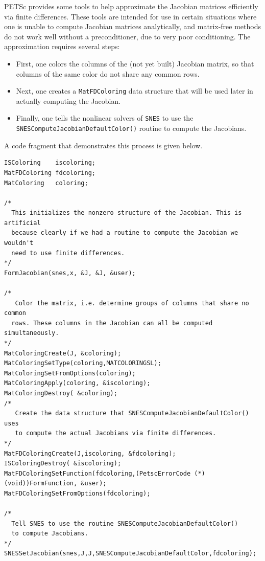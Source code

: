 PETSc provides some tools to help approximate the Jacobian matrices efficiently via
finite differences.  These tools are intended for use in certain situations where
one is unable to compute Jacobian matrices analytically, and matrix-free methods
do not work well without a preconditioner, due to very poor conditioning.
The approximation requires several steps:
\begin{itemize}
\item First, one colors the columns of the (not yet built) Jacobian matrix, so that
      columns of the same color do not share any common rows.
\item Next, one creates a \lstinline{MatFDColoring} data structure that will be used later in
      actually computing the Jacobian.
\item Finally, one tells the nonlinear solvers of \lstinline{SNES} to use the
      \lstinline{SNESComputeJacobianDefaultColor()}
      routine to compute the Jacobians.
\end{itemize}
A code fragment that demonstrates this process is given below.
\begin{lstlisting}
ISColoring    iscoloring;
MatFDColoring fdcoloring;
MatColoring   coloring;

/*
  This initializes the nonzero structure of the Jacobian. This is artificial
  because clearly if we had a routine to compute the Jacobian we wouldn't
  need to use finite differences.
*/
FormJacobian(snes,x, &J, &J, &user);

/*
   Color the matrix, i.e. determine groups of columns that share no common 
  rows. These columns in the Jacobian can all be computed simultaneously.
*/
MatColoringCreate(J, &coloring);
MatColoringSetType(coloring,MATCOLORINGSL);
MatColoringSetFromOptions(coloring);
MatColoringApply(coloring, &iscoloring);
MatColoringDestroy( &coloring);
/*
   Create the data structure that SNESComputeJacobianDefaultColor() uses
   to compute the actual Jacobians via finite differences.
*/
MatFDColoringCreate(J,iscoloring, &fdcoloring);
ISColoringDestroy( &iscoloring);
MatFDColoringSetFunction(fdcoloring,(PetscErrorCode (*)(void))FormFunction, &user);
MatFDColoringSetFromOptions(fdcoloring);

/*
  Tell SNES to use the routine SNESComputeJacobianDefaultColor()
  to compute Jacobians.
*/
SNESSetJacobian(snes,J,J,SNESComputeJacobianDefaultColor,fdcoloring);

\end{lstlisting}

